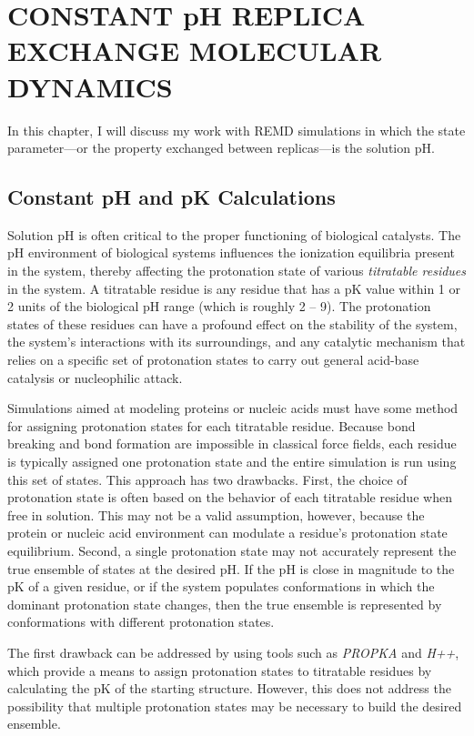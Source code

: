 \chapter{CONSTANT pH REPLICA EXCHANGE MOLECULAR DYNAMICS}

In this chapter, I will discuss my work with REMD simulations in which the state
parameter---or the property exchanged between replicas---is the solution pH.

\section{Constant pH and pK Calculations}

Solution pH is often critical to the proper functioning of biological catalysts.
\cite{Cornish-Bowden1969,White1959}  The pH environment of biological systems
influences the ionization equilibria present in the system, thereby affecting
the protonation state of various \emph{titratable residues} in the system.  A
titratable residue is any residue that has a pK value within 1 or 2 units
of the biological pH range (which is roughly 2 -- 9).  The protonation states of
these residues can have a profound effect on the stability of the system, the
system's interactions with its surroundings, and any catalytic mechanism that
relies on a specific set of protonation states to carry out general acid-base
catalysis or nucleophilic attack. \cite{Tanford1957}

Simulations aimed at modeling proteins or nucleic acids must have some method
for assigning protonation states for each titratable residue.  Because bond
breaking and bond formation are impossible in classical force fields, each
residue is typically assigned one protonation state and the entire simulation is
run using this set of states.  This approach has two drawbacks.  First, the
choice of protonation state is often based on the behavior of each titratable
residue when free in solution.  This may not be a valid assumption, however,
because the protein or nucleic acid environment can modulate a residue's
protonation state equilibrium.  Second, a single protonation state may not
accurately represent the true ensemble of states at the desired pH.  If the pH
is close in magnitude to the pK of a given residue, or if the system
populates conformations in which the dominant protonation state changes, then
the true ensemble is represented by conformations with different protonation
states.

The first drawback can be addressed by using tools such as \emph{PROPKA}
\cite{Olsson2011} and \emph{H++}, \cite{Myers2006} which provide a means to
assign protonation states to titratable residues by calculating the pK of
the starting structure.  However, this does not address the possibility  that
multiple protonation states may be necessary to build the desired ensemble.

